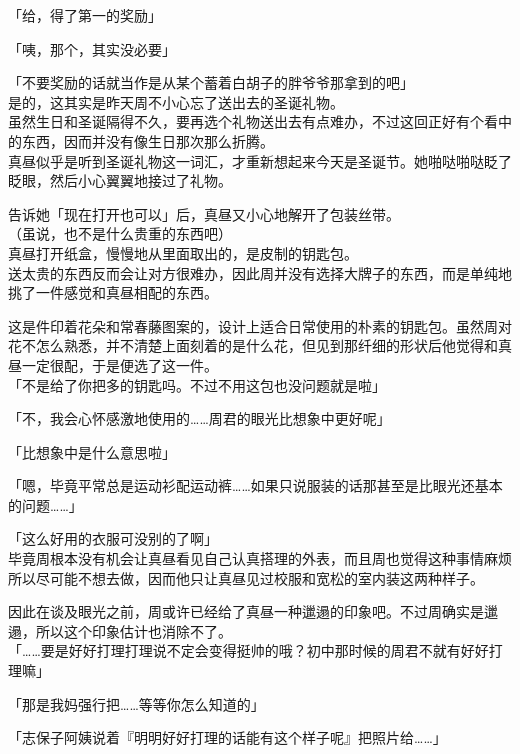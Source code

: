 「给，得了第一的奖励」

「咦，那个，其实没必要」

「不要奖励的话就当作是从某个蓄着白胡子的胖爷爷那拿到的吧」\\

是的，这其实是昨天周不小心忘了送出去的圣诞礼物。\\

虽然生日和圣诞隔得不久，要再选个礼物送出去有点难办，不过这回正好有个看中的东西，因而并没有像生日那次那么折腾。\\

真昼似乎是听到圣诞礼物这一词汇，才重新想起来今天是圣诞节。她啪哒啪哒眨了眨眼，然后小心翼翼地接过了礼物。

告诉她「现在打开也可以」后，真昼又小心地解开了包装丝带。\\

（虽说，也不是什么贵重的东西吧）\\

真昼打开纸盒，慢慢地从里面取出的，是皮制的钥匙包。\\

送太贵的东西反而会让对方很难办，因此周并没有选择大牌子的东西，而是单纯地挑了一件感觉和真昼相配的东西。

这是件印着花朵和常春藤图案的，设计上适合日常使用的朴素的钥匙包。虽然周对花不怎么熟悉，并不清楚上面刻着的是什么花，但见到那纤细的形状后他觉得和真昼一定很配，于是便选了这一件。\\

「不是给了你把多的钥匙吗。不过不用这包也没问题就是啦」

「不，我会心怀感激地使用的……周君的眼光比想象中更好呢」

「比想象中是什么意思啦」

「嗯，毕竟平常总是运动衫配运动裤……如果只说服装的话那甚至是比眼光还基本的问题……」

「这么好用的衣服可没别的了啊」\\

毕竟周根本没有机会让真昼看见自己认真搭理的外表，而且周也觉得这种事情麻烦所以尽可能不想去做，因而他只让真昼见过校服和宽松的室内装这两种样子。

因此在谈及眼光之前，周或许已经给了真昼一种邋遢的印象吧。不过周确实是邋遢，所以这个印象估计也消除不了。\\

「……要是好好打理打理说不定会变得挺帅的哦？初中那时候的周君不就有好好打理嘛」

「那是我妈强行把……等等你怎么知道的」

「志保子阿姨说着『明明好好打理的话能有这个样子呢』把照片给……」

